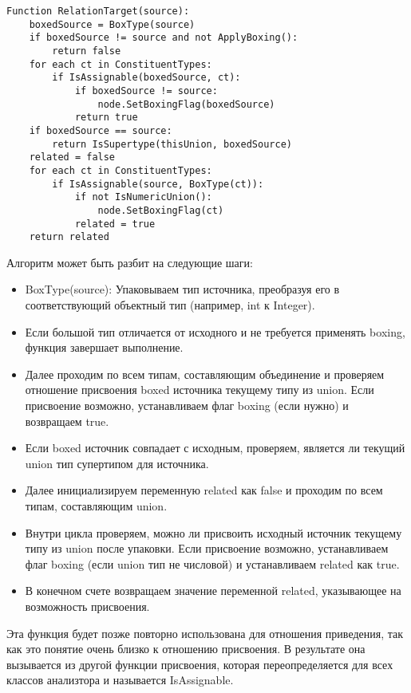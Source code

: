 \begin{lstlisting}[label={lst:relationtarget}]
Function RelationTarget(source):
    boxedSource = BoxType(source)
    if boxedSource != source and not ApplyBoxing():
        return false
    for each ct in ConstituentTypes:
        if IsAssignable(boxedSource, ct):
            if boxedSource != source:
                node.SetBoxingFlag(boxedSource)
            return true
    if boxedSource == source:
        return IsSupertype(thisUnion, boxedSource)
    related = false
    for each ct in ConstituentTypes:
        if IsAssignable(source, BoxType(ct)):
            if not IsNumericUnion():
                node.SetBoxingFlag(ct)
            related = true
    return related
\end{lstlisting}

Алгоритм может быть разбит на следующие шаги:

\begin{itemize}[left=2em]
    \item BoxType(source): Упаковываем тип источника, преобразуя его в соответствующий объектный тип
    (например, int к Integer).
    \item Если большой тип отличается от исходного и не требуется применять boxing, функция завершает выполнение.
    \item Далее проходим по всем типам, составляющим объединение и проверяем отношение присвоения boxed источника
    текущему типу из union.
    Если присвоение возможно, устанавливаем флаг boxing (если нужно) и возвращаем true.
    \item Если boxed источник совпадает с исходным, проверяем, является ли текущий union тип супертипом для источника.
    \item Далее инициализируем переменную related как false и проходим по всем типам, составляющим union.
    \item Внутри цикла проверяем, можно ли присвоить исходный источник текущему типу из union после упаковки.
    Если присвоение возможно, устанавливаем флаг boxing (если union тип не числовой) и устанавливаем related как true.
    \item В конечном счете возвращаем значение переменной related, указывающее на возможность присвоения.
\end{itemize}

Эта функция будет позже повторно использована для отношения приведения, так как это понятие очень близко к отношению
присвоения.
В результате она вызывается из другой функции присвоения, которая переопределяется для всех классов анализтора и
называется IsAssignable.

